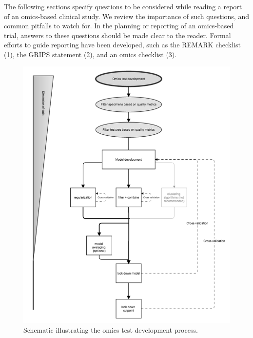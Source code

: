 \documentclass[11pt]{article}
\makeatletter
\def\maxwidth{\ifdim\Gin@nat@width>\linewidth\linewidth
\else\Gin@nat@width\fi}
\let\Oldincludegraphics\includegraphics
\renewcommand{\includegraphics}[1]{\Oldincludegraphics[width=\maxwidth]{#1}}
\makeatother
\begin{document}
The following sections specify questions to be considered while reading
a report of an omics-based clinical study. We review the importance of
such questions, and common pitfalls to watch for. In the planning or
reporting of an omics-based trial, answers to these questions should be
made clear to the reader. Formal efforts to guide reporting have been
developed, such as the REMARK checklist (1), the GRIPS statement (2),
and an omics checklist (3).

\begin{figure}[htbp]
\centering
\includegraphics{figure1-2014-12-15.png}
\caption{Schematic illustrating the omics test development process.}
\end{figure}
\end{document}
